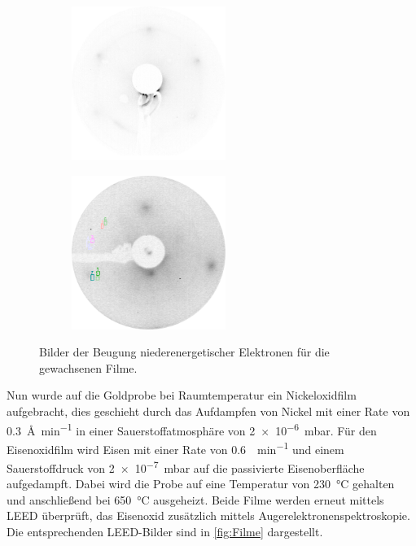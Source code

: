             \begin{figure}
                \centering
                \begin{subfigure}{0.48\textwidth}
                    \centering
                    \includegraphics[height=5cm]{./content/pictures/2021_06_15_019_NiO(111)_73eV_Thicklayer}
                \end{subfigure}
                \begin{subfigure}{0.48\textwidth}
                    \centering
                    \includegraphics[height=5cm]{./content/pictures/FeO/2021_09_09_001_FeO_125eV.png}
                \end{subfigure}
                \caption{Bilder der Beugung niederenergetischer Elektronen für die gewachsenen Filme.}
            \label{fig:Filme}
            \end{figure}
            Nun wurde auf die Goldprobe bei Raumtemperatur ein Nickeloxidfilm aufgebracht, dies geschieht durch das Aufdampfen von Nickel mit einer Rate von \SI{0.3}{\angstrom\per\minute} in einer Sauerstoffatmosphäre von \SI{2e-6}{\milli\bar}.
            Für den Eisenoxidfilm wird Eisen mit einer Rate von \SI{0.6}{\ML\per\minute} und einem Sauerstoffdruck von \SI{2e-7}{\milli\bar} auf die passivierte Eisenoberfläche aufgedampft.
            Dabei wird die Probe auf eine Temperatur von \SI{230}{\celsius} gehalten und anschließend bei \SI{650}{\celsius} ausgeheizt.
            Beide Filme werden erneut mittels LEED überprüft, das Eisenoxid zusätzlich mittels Augerelektronenspektroskopie.
            Die entsprechenden LEED-Bilder sind in \autoref{fig:Filme} dargestellt.

